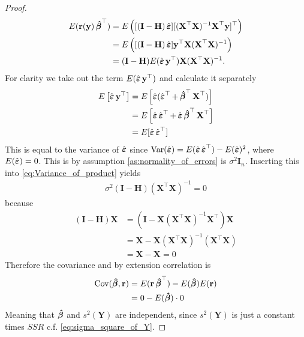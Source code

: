 \begin{proof}
\begin{align} \label{eq:Variance_of_product}
    E(\textbf{r}(\textbf{y}) \operatorname{\boldsymbol{\hat{\beta}}}^\top) &= E \left( [(\textbf{I} - \textbf{H}) \operatorname{\hat{\boldsymbol{\varepsilon}}}] [(\textbf{X}^\top \textbf{X})^{-1} \textbf{X}^\top \textbf{y}]^\top \right) \\
    &= E \left( [(\textbf{I}-\textbf{H}) \operatorname{\hat{\boldsymbol{\varepsilon}}}] \textbf{y}^\top \textbf{X} (\textbf{X}^\top \textbf{X})^{-1} \right) \nonumber \\
    &= (\textbf{I}-\textbf{H}) E(\operatorname{\hat{\boldsymbol{\varepsilon}}} \textbf{y}^\top ) \textbf{X}(\textbf{X}^\top \textbf{X})^{-1}. \nonumber
\end{align}
For clarity we take out the term $E(\operatorname{\hat{\boldsymbol{\varepsilon}}} \textbf{y}^\top )$ and calculate it separately
\begin{align*}
    E \left[ \operatorname{\hat{\boldsymbol{\varepsilon}}} \textbf{y}^\top \right] &= E \left[ \operatorname{\hat{\boldsymbol{\varepsilon}}} (\operatorname{\hat{\boldsymbol{\varepsilon}}}^\top + \operatorname{\boldsymbol{\hat{\beta}}}^\top \textbf{X}^\top) \right] \\
    &= E \left[ \operatorname{\hat{\boldsymbol{\varepsilon}}} \operatorname{\hat{\boldsymbol{\varepsilon}}}^\top + \operatorname{\hat{\boldsymbol{\varepsilon}}} \operatorname{\boldsymbol{\hat{\beta}}}^\top \textbf{X}^\top \right] \\
    &= E[\operatorname{\hat{\boldsymbol{\varepsilon}}} \operatorname{\hat{\boldsymbol{\varepsilon}}}^\top]
\end{align*}
This is equal to the variance of $\operatorname{\hat{\boldsymbol{\varepsilon}}}$ since $\operatorname{\text{Var}}(\operatorname{\hat{\boldsymbol{\varepsilon}}}) = E(\operatorname{\hat{\boldsymbol{\varepsilon}}} \operatorname{\hat{\boldsymbol{\varepsilon}}}^\top) - E(\operatorname{\hat{\boldsymbol{\varepsilon}}})^2$, where $E(\operatorname{\hat{\boldsymbol{\varepsilon}}})=0$.
This is by assumption \ref{as:normality_of_errors} is $\sigma^2 \textbf{I}_n$.
Inserting this into \eqref{eq:Variance_of_product} yields
\begin{align*}
    \sigma^2 (\textbf{I}-\textbf{H})  (\textbf{X}^\top \textbf{X})^{-1} = 0
\end{align*}
because
\begin{align*}
    (\textbf{I}-\textbf{H})\textbf{X} &= (\textbf{I}-\textbf{X}(\textbf{X}^\top \textbf{X})^{-1}\textbf{X}^\top)\textbf{X} \\
    &= \textbf{X} - \textbf{X} (\textbf{X}^\top \textbf{X})^{-1} (\textbf{X}^\top \textbf{X}) \\
    &= \textbf{X} - \textbf{X} = 0
\end{align*}
Therefore the covariance and by extension correlation is
\begin{align*}
    \operatorname{\text{Cov}} (\operatorname{\boldsymbol{\hat{\beta}}}, \textbf{r}) &= E(\textbf{r} \operatorname{\boldsymbol{\hat{\beta}}}^\top) - E(\operatorname{\boldsymbol{\hat{\beta}}}) E(\textbf{r}) \\
    &= 0 - E(\operatorname{\boldsymbol{\hat{\beta}}}) \cdot 0
\end{align*}
Meaning that $\operatorname{\boldsymbol{\hat{\beta}}}$ and $s^2(\textbf{Y})$ are independent, since $s^2(\textbf{Y})$ is just a constant times $SSR$ c.f.$\!$ \eqref{eq:sigma_square_of_Y}.


\end{proof}
